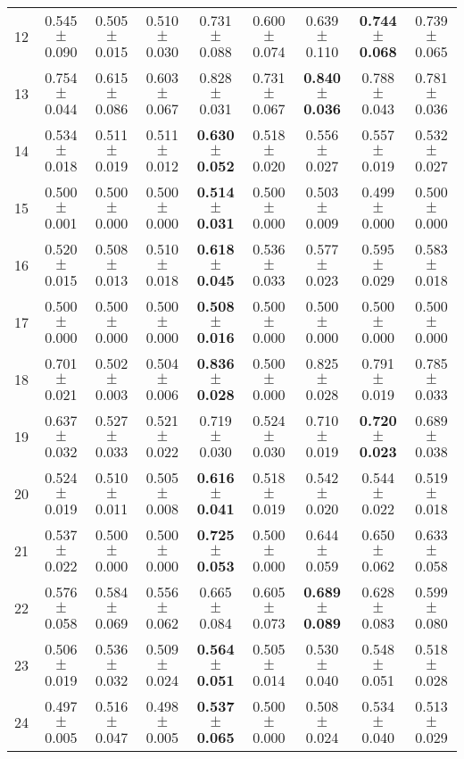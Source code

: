 \begin{table}[!ht]
{\begin{tabular}{r c c c c c c c c}
12 & 0.545 $\pm$ 0.090 & 0.505 $\pm$ 0.015 & 0.510 $\pm$ 0.030 & 0.731 $\pm$ 0.088 & 0.600 $\pm$ 0.074 & 0.639 $\pm$ 0.110 & \textbf{0.744 $\pm$ 0.068} & 0.739 $\pm$ 0.065 \\
13 & 0.754 $\pm$ 0.044 & 0.615 $\pm$ 0.086 & 0.603 $\pm$ 0.067 & 0.828 $\pm$ 0.031 & 0.731 $\pm$ 0.067 & \textbf{0.840 $\pm$ 0.036} & 0.788 $\pm$ 0.043 & 0.781 $\pm$ 0.036 \\
14 & 0.534 $\pm$ 0.018 & 0.511 $\pm$ 0.019 & 0.511 $\pm$ 0.012 & \textbf{0.630 $\pm$ 0.052} & 0.518 $\pm$ 0.020 & 0.556 $\pm$ 0.027 & 0.557 $\pm$ 0.019 & 0.532 $\pm$ 0.027 \\
15 & 0.500 $\pm$ 0.001 & 0.500 $\pm$ 0.000 & 0.500 $\pm$ 0.000 & \textbf{0.514 $\pm$ 0.031} & 0.500 $\pm$ 0.000 & 0.503 $\pm$ 0.009 & 0.499 $\pm$ 0.000 & 0.500 $\pm$ 0.000 \\
16 & 0.520 $\pm$ 0.015 & 0.508 $\pm$ 0.013 & 0.510 $\pm$ 0.018 & \textbf{0.618 $\pm$ 0.045} & 0.536 $\pm$ 0.033 & 0.577 $\pm$ 0.023 & 0.595 $\pm$ 0.029 & 0.583 $\pm$ 0.018 \\
17 & 0.500 $\pm$ 0.000 & 0.500 $\pm$ 0.000 & 0.500 $\pm$ 0.000 & \textbf{0.508 $\pm$ 0.016} & 0.500 $\pm$ 0.000 & 0.500 $\pm$ 0.000 & 0.500 $\pm$ 0.000 & 0.500 $\pm$ 0.000 \\
18 & 0.701 $\pm$ 0.021 & 0.502 $\pm$ 0.003 & 0.504 $\pm$ 0.006 & \textbf{0.836 $\pm$ 0.028} & 0.500 $\pm$ 0.000 & 0.825 $\pm$ 0.028 & 0.791 $\pm$ 0.019 & 0.785 $\pm$ 0.033 \\
19 & 0.637 $\pm$ 0.032 & 0.527 $\pm$ 0.033 & 0.521 $\pm$ 0.022 & 0.719 $\pm$ 0.030 & 0.524 $\pm$ 0.030 & 0.710 $\pm$ 0.019 & \textbf{0.720 $\pm$ 0.023} & 0.689 $\pm$ 0.038 \\
20 & 0.524 $\pm$ 0.019 & 0.510 $\pm$ 0.011 & 0.505 $\pm$ 0.008 & \textbf{0.616 $\pm$ 0.041} & 0.518 $\pm$ 0.019 & 0.542 $\pm$ 0.020 & 0.544 $\pm$ 0.022 & 0.519 $\pm$ 0.018 \\
21 & 0.537 $\pm$ 0.022 & 0.500 $\pm$ 0.000 & 0.500 $\pm$ 0.000 & \textbf{0.725 $\pm$ 0.053} & 0.500 $\pm$ 0.000 & 0.644 $\pm$ 0.059 & 0.650 $\pm$ 0.062 & 0.633 $\pm$ 0.058 \\
22 & 0.576 $\pm$ 0.058 & 0.584 $\pm$ 0.069 & 0.556 $\pm$ 0.062 & 0.665 $\pm$ 0.084 & 0.605 $\pm$ 0.073 & \textbf{0.689 $\pm$ 0.089} & 0.628 $\pm$ 0.083 & 0.599 $\pm$ 0.080 \\
23 & 0.506 $\pm$ 0.019 & 0.536 $\pm$ 0.032 & 0.509 $\pm$ 0.024 & \textbf{0.564 $\pm$ 0.051} & 0.505 $\pm$ 0.014 & 0.530 $\pm$ 0.040 & 0.548 $\pm$ 0.051 & 0.518 $\pm$ 0.028 \\
24 & 0.497 $\pm$ 0.005 & 0.516 $\pm$ 0.047 & 0.498 $\pm$ 0.005 & \textbf{0.537 $\pm$ 0.065} & 0.500 $\pm$ 0.000 & 0.508 $\pm$ 0.024 & 0.534 $\pm$ 0.040 & 0.513 $\pm$ 0.029 \\

\end{tabular}}
\end{table}
